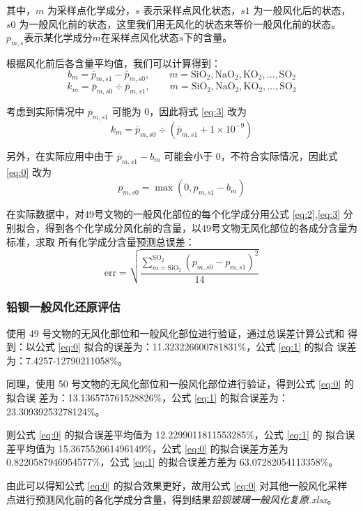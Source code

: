 \documentclass[withoutpreface,bwprint]{cumcmthesis} %
\begin{document}
其中，$m$ 为采样点化学成分，$s$ 表示采样点风化状态，$s1$ 为一般风化后的状态，
$s0$ 为一般风化前的状态，这里我们用无风化的状态来等价一般风化前的状态。
$p_{m,s}$表示某化学成分$m$在采样点风化状态$s$下的含量。

根据风化前后各含量平均值，我们可以计算得到：
\begin{equation}
    b_m=\overline{p}_{m,s1}-\overline{p}_{m,s0},\qquad m=\mathrm{SiO_2,NaO_2,KO_2,\dots,SO_2}
    \label{eq:2}
\end{equation}
\begin{equation}
    k_m=\overline{p}_{m,s0}\div\overline{p}_{m,s1},\qquad m=\mathrm{SiO_2,NaO_2,KO_2,\dots,SO_2}
    \label{eq:3}
\end{equation}

考虑到实际情况中 $\overline{p}_{m,s1}$ 可能为 0，因此将式 \eqref{eq:3} 改为 
\[
    k_m=\overline{p}_{m,s0}\div(\overline{p}_{m,s1}+1\times 10^{-9})
\]

另外，在实际应用中由于 $\overline{p}_{m,s1}-b_m$ 可能会小于 0，不符合实际情况，因此式 
\ref{eq:0} 改为
\[
    p_{m,s0}=\max(0,p_{m,s1}-b_m)
\]

在实际数据中，对49号文物的一般风化部位的每个化学成分用公式 \eqref{eq:2},\eqref{eq:3}
分别拟合，得到各个化学成分风化前的含量，以49号文物无风化部位的各成分含量为标准，求取
所有化学成分含量预测总误差：
\begin{equation*}
    \mathrm{err}=\sqrt{\frac{\sum_{m=\mathrm{SiO_2}}^{\mathrm{SO_2}}
            (p_{m,s0}-p_{m,s1})^2}{14}}
\end{equation*}

\subsubsection{铅钡一般风化还原评估}
使用 49 号文物的无风化部位和一般风化部位进行验证，通过总误差计算公式和
得到：以公式 \eqref{eq:0} 拟合的误差为：11.323226600781831\%，公式 \eqref{eq:1} 的拟合
误差为：7.4257-12790211058\%。

同理，使用 50 号文物的无风化部位和一般风化部位进行验证，得到公式 \eqref{eq:0} 的拟合误
差为：13.136575761528826\%，公式 \eqref{eq:1} 的拟合误差为：23.30939253278124\%。

则公式 \eqref{eq:0} 的拟合误差平均值为 12.2299011811553285\%，公式 \eqref{eq:1} 的
拟合误差平均值为 15.367552661496149\%，公式 \eqref{eq:0} 的拟合误差方差为
0.8220587946954577\%，公式 \eqref{eq:1} 的拟合误差方差为 63.07282054113358\%。

由此可以得知公式 \eqref{eq:0} 的拟合效果更好，故用公式 \eqref{eq:0} 对其他一般风化采样
点进行预测风化前的各化学成分含量，得到结果\emph{铅钡玻璃一般风化复原.xlsx}。
\end{document}

